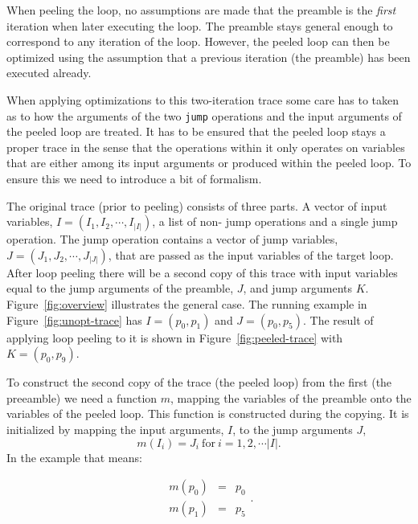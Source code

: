 \documentclass[preprint]{sigplanconf}
\begin{document}
When peeling the loop, no assumptions are made that the preamble is
the \emph{first} iteration when later executing the loop. The preamble stays
general enough to correspond to any iteration of the loop.
However, the peeled loop can then be optimized using the assumption that a
previous iteration (the preamble) has been executed already.


When applying optimizations to this two-iteration trace
some care has to taken as to how the arguments of the two
\lstinline{jump} operations and the input arguments of the peeled loop are
treated. It has to be ensured that the peeled loop stays a proper
trace in the sense that the operations within it only operates on
variables that are either among its input arguments 
or produced within the peeled loop. To ensure this we need
to introduce a bit of formalism.

The original trace (prior to peeling) consists of three parts.
A vector of input
variables, $I=\left(I_1, I_2, \cdots, I_{|I|}\right)$, a list of non-
jump operations and a single
jump operation. The jump operation contains a vector of jump variables,
$J=\left(J_1, J_2, \cdots, J_{|J|}\right)$, that are passed as the input variables of the target loop. After
loop peeling there will be a second copy of this trace with input
variables equal to the jump arguments of the preamble, $J$, and jump
arguments $K$. 
Figure~\ref{fig:overview} illustrates the general case. The running
example in Figure~\ref{fig:unopt-trace} has  $I = \left( p_0, p_1
\right)$ and $J = \left( p_0, p_5 \right)$. The result of applying
loop peeling to it is shown in Figure~\ref{fig:peeled-trace} with 
$K = \left( p_0, p_9 \right)$. 

To construct the second copy of the trace (the peeled loop) from the
first (the preeamble) we need a
function $m$, mapping the variables of the preamble onto the
variables of the peeled loop. This function is constructed during the
copying. It is initialized by mapping the input arguments, $I$, to
the jump arguments $J$,
\begin{equation}
  m\left(I_i\right) = J_i \ \text{for}\ i = 1, 2, \cdots |I| .
\end{equation}
In the example that means:

\begin{equation}
    \begin{array}{lcl}
      m\left(p_0\right) &=& p_0 \\
      m\left(p_1\right) &=& p_5
    \end{array}
  .
\end{equation}
\end{document}

